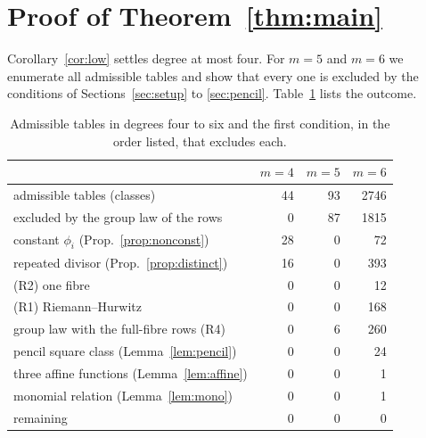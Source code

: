 \documentclass[11pt]{amsart}
\theoremstyle{definition}
\begin{document}
\section{Proof of Theorem~\ref{thm:main}}\label{sec:proof}

Corollary~\ref{cor:low} settles degree at most four. For $m=5$ and $m=6$ we enumerate all admissible tables and show
that every one is excluded by the conditions of Sections~\ref{sec:setup} to \ref{sec:pencil}. Table~\ref{tab:counts}
lists the outcome.

\begin{table}[h]
\centering\small
\begin{tabular}{lrrr}
\toprule
& $m=4$ & $m=5$ & $m=6$\\
\midrule
admissible tables (classes) & 44 & 93 & 2746\\
excluded by the group law of the rows & 0 & 87 & 1815\\
constant $\phi_i$ (Prop.~\ref{prop:nonconst}) & 28 & 0 & 72\\
repeated divisor (Prop.~\ref{prop:distinct}) & 16 & 0 & 393\\
(R2) one fibre & 0 & 0 & 12\\
(R1) Riemann--Hurwitz & 0 & 0 & 168\\
group law with the full-fibre rows (R4) & 0 & 6 & 260\\
pencil square class (Lemma~\ref{lem:pencil}) & 0 & 0 & 24\\
three affine functions (Lemma~\ref{lem:affine}) & 0 & 0 & 1\\
monomial relation (Lemma~\ref{lem:mono}) & 0 & 0 & 1\\
\midrule
remaining & 0 & 0 & 0\\
\bottomrule
\end{tabular}
\caption{Admissible tables in degrees four to six and the first condition, in the order listed, that excludes each.}
\label{tab:counts}
\end{table}
\end{document}

